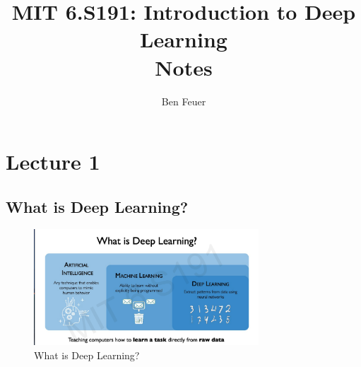 \documentclass{report}
\title{\Huge{MIT 6.S191: Introduction to Deep Learning\\Notes}}
\author{\huge{Ben Feuer}}
\date{}
\begin{document}
\maketitle
\newpage%
\pagebreak

\chapter{Lecture 1}

\section{What is Deep Learning?} 

\begin{figure}[h]
  \begin{center}
    \includegraphics[width=0.75\textwidth]{figures/what_is_deep_learning.jpg}
  \end{center}
  \caption{What is Deep Learning?}
  \label{fig:lecture1/what_is_deep_learning.jpg}
\end{figure}
\end{document}
